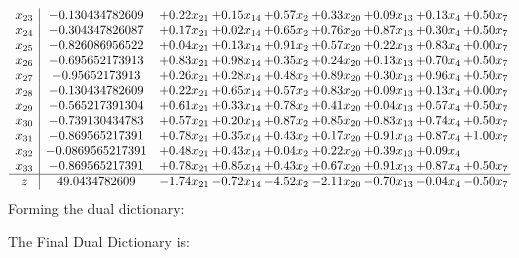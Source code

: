 \documentclass[8pt]{article}
\begin{document}
\[\begin{array}{c| c c@{\hskip 2pt} c@{\hskip 2pt} c@{\hskip 2pt} c@{\hskip 2pt} c@{\hskip 2pt} c@{\hskip 2pt} c@{\hskip 2pt} }
 x_{23}   &  -0.130434782609 & +  0.22 x_{21} & +  0.15 x_{14} & +  0.57 x_{2} & +  0.33 x_{20} & +  0.09 x_{13} & +  0.13 x_{4} & +  0.50 x_{7}\\
 x_{24}   &  -0.304347826087 & +  0.17 x_{21} & +  0.02 x_{14} & +  0.65 x_{2} & +  0.76 x_{20} & +  0.87 x_{13} & +  0.30 x_{4} & +  0.50 x_{7}\\
 x_{25}   &  -0.826086956522 & +  0.04 x_{21} & +  0.13 x_{14} & +  0.91 x_{2} & +  0.57 x_{20} & +  0.22 x_{13} & +  0.83 x_{4} & +  0.00 x_{7}\\
 x_{26}   &  -0.695652173913 & +  0.83 x_{21} & +  0.98 x_{14} & +  0.35 x_{2} & +  0.24 x_{20} & +  0.13 x_{13} & +  0.70 x_{4} & +  0.50 x_{7}\\
 x_{27}   &  -0.95652173913 & +  0.26 x_{21} & +  0.28 x_{14} & +  0.48 x_{2} & +  0.89 x_{20} & +  0.30 x_{13} & +  0.96 x_{4} & +  0.50 x_{7}\\
 x_{28}   &  -0.130434782609 & +  0.22 x_{21} & +  0.65 x_{14} & +  0.57 x_{2} & +  0.83 x_{20} & +  0.09 x_{13} & +  0.13 x_{4} & +  0.00 x_{7}\\
 x_{29}   &  -0.565217391304 & +  0.61 x_{21} & +  0.33 x_{14} & +  0.78 x_{2} & +  0.41 x_{20} & +  0.04 x_{13} & +  0.57 x_{4} & +  0.50 x_{7}\\
 x_{30}   &  -0.739130434783 & +  0.57 x_{21} & +  0.20 x_{14} & +  0.87 x_{2} & +  0.85 x_{20} & +  0.83 x_{13} & +  0.74 x_{4} & +  0.50 x_{7}\\
 x_{31}   &  -0.869565217391 & +  0.78 x_{21} & +  0.35 x_{14} & +  0.43 x_{2} & +  0.17 x_{20} & +  0.91 x_{13} & +  0.87 x_{4} & +  1.00 x_{7}\\
 x_{32}   &  -0.0869565217391 & +  0.48 x_{21} & +  0.43 x_{14} & +  0.04 x_{2} & +  0.22 x_{20} & +  0.39 x_{13} & +  0.09 x_{4} &   \\
 x_{33}   &  -0.869565217391 & +  0.78 x_{21} & +  0.85 x_{14} & +  0.43 x_{2} & +  0.67 x_{20} & +  0.91 x_{13} & +  0.87 x_{4} & +  0.50 x_{7}\\
\hline
z    &  49.0434782609 & -1.74 x_{21} & -0.72 x_{14} & -4.52 x_{2} & -2.11 x_{20} & -0.70 x_{13} & -0.04 x_{4} & -0.50 x_{7}\\
\end{array}\]
Forming the dual dictionary:

The Final Dual Dictionary is: 
\end{document}
